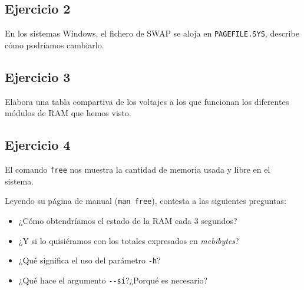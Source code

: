\documentclass[11pt]{article}
\begin{document}
\subsection{Ejercicio 2}
\label{sec:orge95d683}

En los sistemas Windows, el fichero de SWAP se aloja en \texttt{PAGEFILE.SYS},
describe cómo podríamos cambiarlo.

\subsection{Ejercicio 3}
\label{sec:org0d28695}

Elabora una tabla compartiva de los voltajes a los que funcionan los
diferentes módulos de RAM que hemos visto.

\subsection{Ejercicio 4}
\label{sec:orga6907be}

El comando \texttt{free} nos muestra la cantidad de memoria usada y libre en el
sistema.

Leyendo su página de manual (\texttt{man free}), contesta a las siguientes
preguntas:

\begin{itemize}
\item ¿Cómo obtendríamos el estado de la RAM cada 3 segundos?
\item ¿Y si lo quisiéramos con los totales expresados en \emph{mebibytes}?
\item ¿Qué significa el uso del parámetro \texttt{-h}?
\item ¿Qué hace el argumento \texttt{-{}-si}?¿Porqué es necesario?
\end{itemize}
\end{document}
